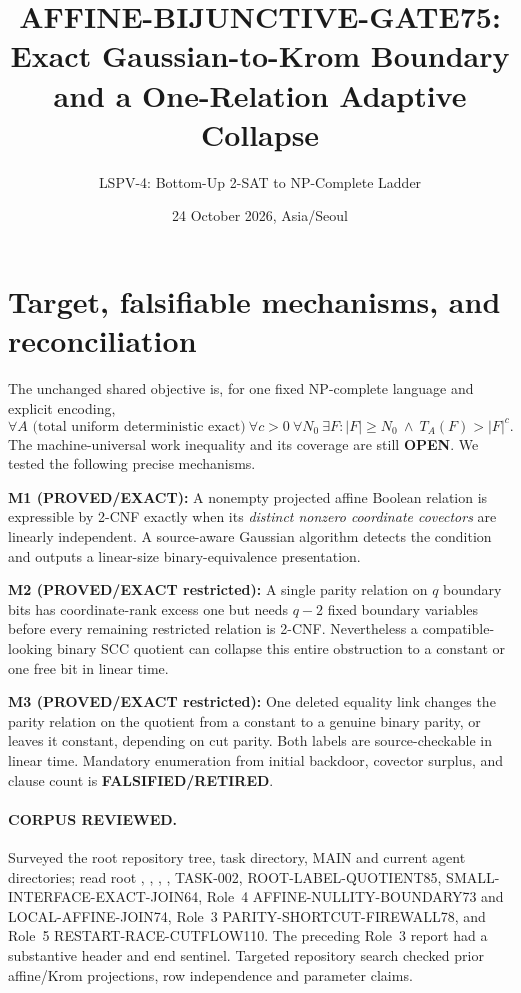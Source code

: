\documentclass[11pt]{article}
\title{AFFINE-BIJUNCTIVE-GATE75:\\ Exact Gaussian-to-Krom Boundary and a One-Relation Adaptive Collapse}
\author{LSPV-4: Bottom-Up 2-SAT to NP-Complete Ladder}
\date{24 October 2026, Asia/Seoul}
\newcommand{\PROVED}{\textbf{PROVED/EXACT}}
\newcommand{\OPEN}{\textbf{OPEN}}
\begin{document}
\maketitle
\begin{center}\end{center}

\section{Target, falsifiable mechanisms, and reconciliation}
The unchanged shared objective is, for one fixed NP-complete language and explicit
encoding,
\[
\forall A\text{ (total uniform deterministic exact)}
\ \forall c>0\ \forall N_0\ \exists F:
|F|\ge N_0\ \land\ T_A(F)>|F|^c. \tag{1}
\]
The machine-universal work inequality and its coverage are still \OPEN.
We tested the following precise mechanisms.

\noindent\textbf{M1 (\PROVED{}):} A nonempty projected affine Boolean relation
is expressible by 2-CNF exactly when its \emph{distinct nonzero coordinate
covectors} are linearly independent. A source-aware Gaussian algorithm detects
the condition and outputs a linear-size binary-equivalence presentation.

\par\noindent\textbf{M2 (\PROVED{} restricted):} A single parity relation on
$q$ boundary bits has coordinate-rank excess one but needs $q-2$ fixed
boundary variables before every remaining restricted relation is 2-CNF.
Nevertheless a compatible-looking binary SCC quotient can collapse this
entire obstruction to a constant or one free bit in linear time.

\par\noindent\textbf{M3 (\PROVED{} restricted):} One deleted equality link
changes the parity relation on the quotient from a constant to a genuine
binary parity, or leaves it constant, depending on cut parity. Both labels
are source-checkable in linear time. Mandatory enumeration from initial
backdoor, covector surplus, and clause count is \textbf{FALSIFIED/RETIRED}.

\paragraph{CORPUS REVIEWED.}
Surveyed the root repository tree, task directory, MAIN and current agent
directories; read root , ,
, , TASK-002,
ROOT-LABEL-QUOTIENT85, SMALL-INTERFACE-EXACT-JOIN64, Role~4
AFFINE-NULLITY-BOUNDARY73 and LOCAL-AFFINE-JOIN74, Role~3
PARITY-SHORTCUT-FIREWALL78, and Role~5 RESTART-RACE-CUTFLOW110.
The preceding Role~3 report had a substantive header and end sentinel.
Targeted repository search checked prior affine/Krom projections,
row independence and parameter claims.
\end{document}
